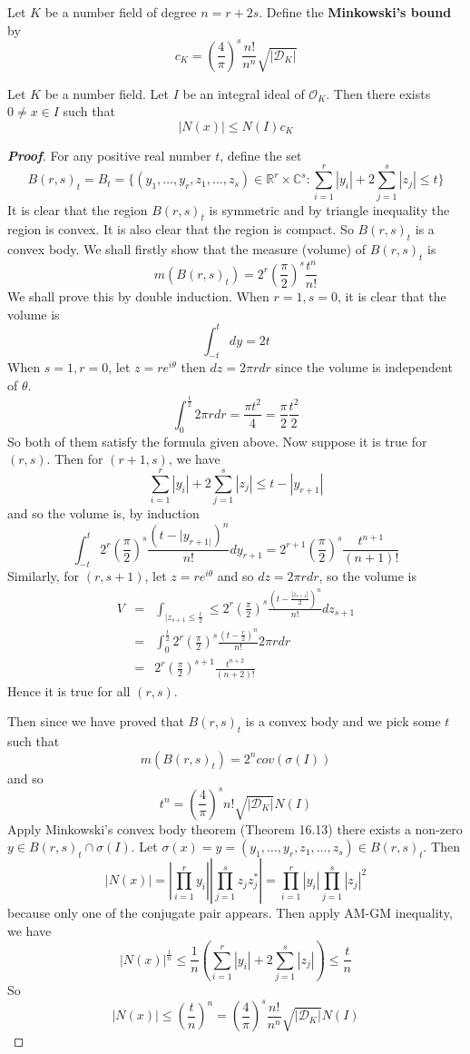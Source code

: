 \begin{definition} Let $K$ be a number field of degree $n=r+2s$. Define the {\bf Minkowski's bound} by
$$c_K=\left(\frac{4}{\pi}\right)^s \frac{n!}{n^n} \sqrt{|\mathcal{D}_K|}$$
\end{definition}
\begin{theorem} Let $K$ be a number field. Let $I$ be an integral ideal of $\mathcal{O}_K$. Then there exists
$0 \neq x \in I$ such that
$$|N(x)| \le N(I)c_K$$
\end{theorem}
\begin{proof}[\bf Proof] For any positive real number $t$, define the set
$$B(r,s)_t=B_t=\{(y_1,\ldots,y_r,z_1,\ldots,z_s) \in \mathbb{R}^r \times \mathbb{C}^s: \sum_{i=1}^r|y_i|+2\sum_{j=1}^s|z_j| \le t\}$$
It is clear that the region $B(r,s)_t$ is symmetric and by triangle inequality the region is convex. It is also clear that the region is compact. So $B(r,s)_t$ is a convex body.
We shall firstly show that the measure (volume) of $B(r,s)_t$ is
$$m(B(r,s)_t)=2^r \left(\frac{\pi}{2}\right)^s \frac{t^n}{n!}$$
We shall prove this by double induction.
When $r=1,s=0$, it is clear that the volume is
$$\int_{-t}^t dy=2t$$
When $s=1,r=0$, let $z=re^{i\theta}$ then $dz=2\pi r dr$ since the volume is independent of $\theta$.
$$\int_{0}^{\frac{t}{2}}  2\pi r dr=\frac{\pi t^2}{4}=\frac{\pi}{2} \frac{t^2}{2}$$
So both of them satisfy the formula given above.
Now suppose it is true for $(r,s)$. Then for $(r+1,s)$, we have
$$\sum_{i=1}^r |y_i|+2\sum_{j=1}^s |z_j| \le t-|y_{r+1}|$$
and so the volume is, by induction
$$\int_{-t}^{t} 2^r \left(\frac{\pi}{2}\right)^s \frac{(t-|y_{r+1|})^n}{n!}dy_{r+1}=2^{r+1} \left(\frac{\pi}{2}\right)^s \frac{t^{n+1}}{(n+1)!}$$
Similarly, for $(r,s+1)$, let $z=r e^{i\theta}$ and so $dz=2\pi r dr$, so the volume is
\begin{eqnarray*}
V&=&\int_{|z_{s+1} \le \frac{t}{2}} \le 2^r \left(\frac{\pi}{2}\right)^s \frac{(t-\frac{|z_{s+1}|}{2})^n}{n!}dz_{s+1}\\
&=&\int_{0}^{\frac{t}{2}} 2^r \left(\frac{\pi}{2}\right)^s \frac{(t-\frac{r}{2})^n}{n!}2\pi r dr\\
&=&2^r\left(\frac{\pi}{2}\right)^{s+1} \frac{t^{n+2}}{(n+2)!}
\end{eqnarray*}
Hence it is true for all $(r,s)$.

Then since we have proved that $B(r,s)_t$ is a convex body and we pick some $t$ such that
$$m(B(r,s)_t)=2^n cov(\sigma(I))$$
and so
$$t^n=\left(\frac{4}{\pi}\right)^s n! \sqrt{|\mathcal{D}_K|}N(I)$$
Apply Minkowski's convex body theorem (Theorem 16.13) there exists a non-zero $y \in B(r,s)_t \cap \sigma(I)$.
Let $\sigma(x)=y=(y_1,\ldots,y_r,z_1,\ldots,z_s) \in B(r,s)_t$. Then
$$|N(x)|=\left|\prod_{i=1}^r y_i\right| \left|\prod_{j=1}^s z_jz^*_j\right|=\prod_{i=1}^r|y_i| \prod_{j=1}^s |z_j|^2$$
because only one of the conjugate pair appears. Then apply AM-GM inequality, we have
$$\left|N(x)\right|^{\frac{1}{n}} \le \frac{1}{n}\left(\sum_{i=1}^r |y_i|+2\sum_{j=1}^s|z_j|\right) \le \frac{t}{n}$$
So
$$|N(x)| \le \left(\frac{t}{n}\right)^n =\left(\frac{4}{\pi}\right)^s \frac{n!}{n^n}\sqrt{|\mathcal{D}_K|}N(I)$$
\end{proof}
